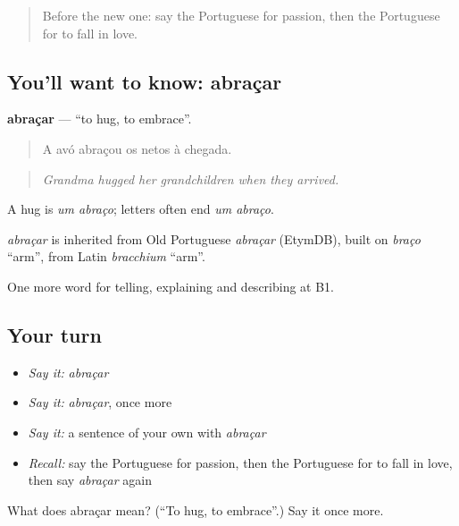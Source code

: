 \label{lesson:PT-C491-abracar}



\begin{quote}
Before the new one: say the Portuguese for passion, then the Portuguese for to fall in love.
\end{quote}

\subsection*{You'll want to know: abraçar}
\textbf{abraçar} — \textquotedblleft{}to hug, to embrace\textquotedblright{}.

\begin{quote}
A avó abraçou os netos à chegada.
\end{quote}

\begin{quote}
\emph{Grandma hugged her grandchildren when they arrived.}
\end{quote}

A hug is \emph{um abraço}; letters often end \emph{um abraço}.

\begin{cousinweb}
\emph{abraçar} is inherited from Old Portuguese \emph{abraçar} (EtymDB), built on \emph{braço} \textquotedblleft{}arm\textquotedblright{}, from Latin \emph{bracchium} \textquotedblleft{}arm\textquotedblright{}.
\end{cousinweb}

\begin{grammarlens}[title={What you've built}]
One more word for telling, explaining and describing at B1.
\end{grammarlens}

\subsection*{Your turn}
\begin{itemize}
\raggedright
  \item \emph{Say it:} \emph{abraçar}
  \item \emph{Say it:} \emph{abraçar}, once more
  \item \emph{Say it:} a sentence of your own with \emph{abraçar}
  \item \emph{Recall:} say the Portuguese for passion, then the Portuguese for to fall in love, then say \emph{abraçar} again
\end{itemize}

\begin{tcolorbox}[breakable,colback=teal!4,colframe=teal!35!black,title={Before you move on}]
What does abraçar mean? (\textquotedblleft{}To hug, to embrace\textquotedblright{}.) Say it once more.
\end{tcolorbox}

